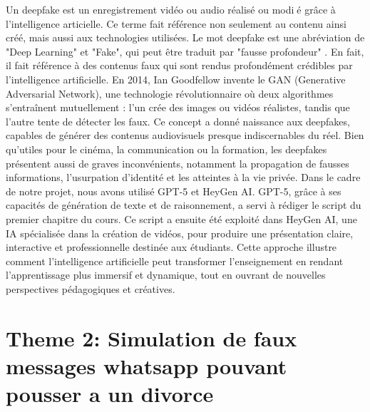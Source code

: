 \documentclass[12pt]{article}
\begin{document}
Un deepfake est un enregistrement vidéo ou audio réalisé ou modié grâce à l'intelligence articielle. Ce terme fait référence non seulement au contenu ainsi créé, mais aussi aux technologies utilisées. Le mot deepfake est une abréviation de "Deep Learning" et "Fake", qui peut être traduit par "fausse profondeur" . En fait, il fait référence à des contenus faux qui sont rendus profondément crédibles par l'intelligence artificielle. En 2014, Ian Goodfellow invente le GAN (Generative Adversarial Network), une technologie révolutionnaire où deux algorithmes s’entraînent mutuellement : l’un crée des images ou vidéos réalistes, tandis que l’autre tente de détecter les faux. Ce concept a donné naissance aux deepfakes, capables de générer des contenus audiovisuels presque indiscernables du réel. Bien qu’utiles pour le cinéma, la communication ou la formation, les deepfakes présentent aussi de graves inconvénients, notamment la propagation de fausses informations, l’usurpation d’identité et les atteintes à la vie privée. Dans le cadre de notre projet, nous avons utilisé GPT-5 et HeyGen AI. GPT-5, grâce à ses capacités de génération de texte et de raisonnement, a servi à rédiger le script du premier chapitre du cours. Ce script a ensuite été exploité dans HeyGen AI, une IA spécialisée dans la création de vidéos, pour produire une présentation claire, interactive et professionnelle destinée aux étudiants. Cette approche illustre comment l’intelligence artificielle peut transformer l’enseignement en rendant l’apprentissage plus immersif et dynamique, tout en ouvrant de nouvelles perspectives pédagogiques et créatives.


\section{Theme 2: Simulation de faux messages whatsapp pouvant pousser a un divorce}
\end{document}
